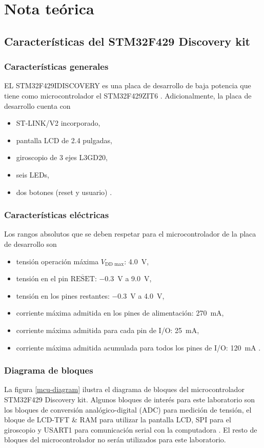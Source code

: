 \section{Nota teórica}
\subsection{Características del STM32F429 Discovery kit}
\subsubsection{Características generales}
EL STM32F429IDISCOVERY es una placa de desarrollo de baja potencia que tiene como microcontrolador el STM32F429ZIT6 \cite{stm32micro, datasheet}. Adicionalmente, la placa de desarrollo cuenta con
\begin{itemize}
    \item ST-LINK/V2 incorporado,
    \item pantalla LCD de 2.4 pulgadas,
    \item giroscopio de 3 ejes L3GD20,
    \item seis LEDs,
    \item dos botones (reset y usuario) \cite{datasheet}.
\end{itemize}
\subsubsection{Características eléctricas}
Los rangos absolutos que se deben respetar para el microcontrolador de la placa de desarrollo son
\begin{itemize}
    \item tensión operación máxima $V_\text{DD max}$: \SI{4.0}{\volt},
    \item tensión en el pin $\overline{\text{RESET}}$: \SI{-0.3}{\volt} a \SI{9.0}{\volt},
    \item tensión en los pines restantes: \SI{-0.3}{\volt} a \SI{4.0}{\volt},
    \item corriente máxima admitida en los pines de alimentación: \SI{270}{\milli\ampere},
    \item corriente máxima admitida para cada pin de I/O: \SI{25}{\milli\ampere},
    \item corriente máxima admitida acumulada para todos los pines de I/O: \SI{120}{\milli\ampere} \cite{stm32micro}.
\end{itemize}
\subsubsection{Diagrama de bloques}
La figura \ref{mcu-diagram} ilustra el diagrama de bloques del microcontrolador STM32F429 Discovery kit. Algunos bloques de interés para este laboratorio son los bloques de conversión analógico-digital (ADC) para medición de tensión, el bloque de LCD-TFT \& RAM para utilizar la pantalla LCD, SPI para el giroscopio y USART1 para comunicación serial con la computadora \cite{datasheet}. El resto de bloques del microcontrolador no serán utilizados para este laboratorio.

